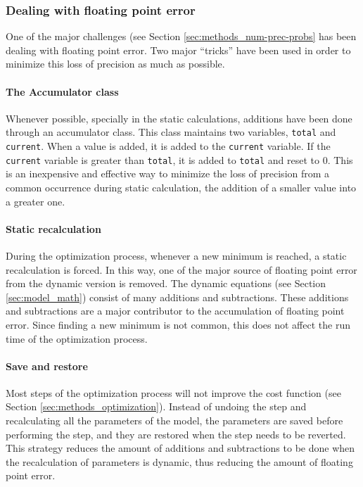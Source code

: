 \subsubsection{Dealing with floating point error}

One of the major challenges (see Section \ref{sec:methods_num-prec-probs} has been dealing with floating point error.
Two major ``tricks'' have been used in order to minimize this loss of precision as much as possible.

\paragraph{The Accumulator class}
Whenever possible, specially in the static calculations, additions have been done through an accumulator class.
This class maintains two variables, \texttt{total} and \texttt{current}.
When a value is added, it is added to the \texttt{current} variable.
If the \texttt{current} variable is greater than \texttt{total}, it is added to \texttt{total} and reset to 0.
This is an inexpensive and effective way to minimize the loss of precision from a common occurrence during static calculation, the addition of a smaller value into a greater one.

\paragraph{Static recalculation}
During the optimization process, whenever a new minimum is reached, a static recalculation is forced.
In this way, one of the major source of floating point error from the dynamic version is removed.
The dynamic equations (see Section \ref{sec:model_math}) consist of many additions and subtractions.
These additions and subtractions are a major contributor to the accumulation of floating point error.
Since finding a new minimum is not common, this does not affect the run time of the optimization process.

\paragraph{Save and restore}
Most steps of the optimization process will not improve the cost function (see Section \ref{sec:methods_optimization}).
Instead of undoing the step and recalculating all the parameters of the model, the parameters are saved before performing the step, and they are restored when the step needs to be reverted.
This strategy reduces the amount of additions and subtractions to be done when the recalculation of parameters is dynamic, thus reducing the amount of floating point error.

